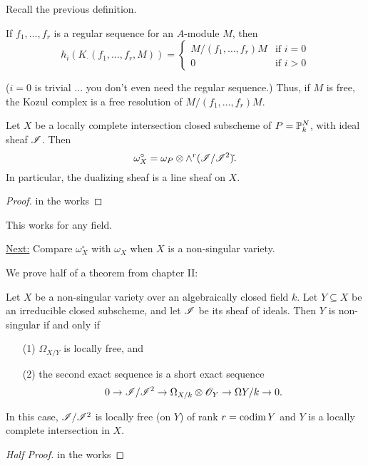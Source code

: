  \setcounter{lecture}{21}

Recall the previous definition.

\begin{proposition} If $f_1,\dots, f_r$ is a regular sequence for
an $A$-module $M$, then
 \[
 h_i(K_{\cdot}(f_1,\dots,f_r,M)) = \left\{\begin{array}{ll}
 M/(f_1,\dots,f_r)M & \text{if } i=0\\
 0 & \text{if } i>0
 \end{array} \right.
 \]
 \end{proposition}
 ($i=0$ is trivial ... you don't even need the regular sequence.)
 Thus, if $M$ is free, the Kozul complex is a free resolution of
 $M/(f_1,\dots, f_r)M$.

 \begin{theorem}
 Let $X$ be a locally complete intersection closed subscheme of
 $P=\P^N_k$, with ideal sheaf $\I$.  Then
 \[
     \omega_X^{\circ} = \omega_P \otimes
     \wedge^r(\I/\I^2)\check{}.
 \]
 In particular, the dualizing sheaf is a line sheaf on $X$.
 \end{theorem}
 \begin{proof}
 in the works
 \end{proof}

 \begin{remark} This works for any field.
 \end{remark}

 \underline{Next:} Compare $\omega_X^{\circ}$ with $\omega_X$ when
 $X$ is a non-singular variety.

 We prove half of a theorem from chapter II:
 \begin{theorem}[II.8.17] Let $X$ be a non-singular variety over
 an algebraically closed field $k$.  Let $Y\subseteq X$ be an
 irreducible closed subscheme, and let $\I$ be its sheaf of
 ideals.  Then $Y$ is non-singular if and only if
 \begin{itemize}
  \item[(1)] $\Omega_{X/Y}$ is locally free, and
  \item[(2)] the second exact sequence is a short exact sequence
  \[
    0\to \I/\I^2 \to \Omega_{X/k}\otimes \O_Y\to \Omega{Y/k} \to
    0.
  \]
  \end{itemize}
  In this case, $\I/\I^2$ is locally free (on $Y$) of rank
  $r=\codim Y$ and $Y$ is a locally complete intersection in $X$.
  \end{theorem}
  \begin{proof}[Half Proof]
  in the works
  \end{proof}
